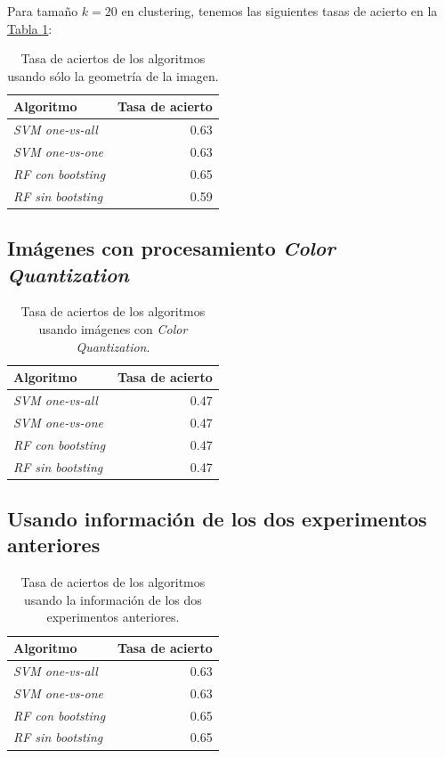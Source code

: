 \documentclass[paper=a4, fontsize=11pt]{article} %
\numberwithin{equation}{section} %
\numberwithin{figure}{section} %
\numberwithin{table}{section} %
\begin{document}
Para tamaño $k=20$ en clustering, tenemos las siguientes tasas de acierto en la \hyperref[res1]{Tabla \ref*{res1}}:

\begin{table}[H]
  \begin{tabular}{l|r}
    \textbf{Algoritmo} & \textbf{Tasa de acierto} \\
    \hline
    \textit{SVM one-vs-all} & $\qquad$ 0.63 \\
    \textit{SVM one-vs-one} & $\qquad$ 0.63 \\
    \textit{RF con bootsting} & $\qquad$ 0.65 \\
    \textit{RF sin bootsting} & $\qquad$ 0.59 \\
  \end{tabular}
  \label{res1}
  \caption{Tasa de aciertos de los algoritmos usando sólo la geometría de la imagen.}
\end{table}

\subsection{Imágenes con procesamiento \textit{Color Quantization}}

\begin{table}[H]
  \begin{tabular}{l|r}
    \textbf{Algoritmo} & \textbf{Tasa de acierto} \\
    \hline
    \textit{SVM one-vs-all} & $\qquad$ 0.47 \\
    \textit{SVM one-vs-one} & $\qquad$ 0.47 \\
    \textit{RF con bootsting} & $\qquad$ 0.47 \\
    \textit{RF sin bootsting} & $\qquad$ 0.47 \\
  \end{tabular}
  \label{res2}
  \caption{Tasa de aciertos de los algoritmos usando imágenes con \textit{Color Quantization}.}
\end{table}

\subsection{Usando información de los dos experimentos anteriores}

\begin{table}[H]
  \begin{tabular}{l|r}
    \textbf{Algoritmo} & \textbf{Tasa de acierto} \\
    \hline
    \textit{SVM one-vs-all} & $\qquad$ 0.63 \\
    \textit{SVM one-vs-one} & $\qquad$ 0.63 \\
    \textit{RF con bootsting} & $\qquad$ 0.65 \\
    \textit{RF sin bootsting} & $\qquad$ 0.65 \\
  \end{tabular}
  \label{res2}
  \caption{Tasa de aciertos de los algoritmos usando la información de los dos experimentos anteriores.}
\end{table}

\end{document}
